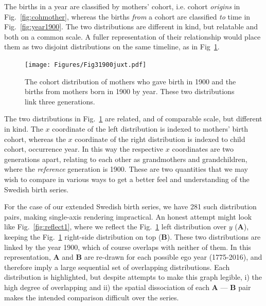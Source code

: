 \documentclass{article}
\begin{document}
The births in a year are classified by mothers' cohort, i.e. cohort \emph{origins} in Fig.~\ref{fig:cohmother}, whereas the births \emph{from} a cohort are classified \emph{to} time in Fig.~\ref{fig:year1900}. The two distributions are different in kind, but relatable and both on a common scale. A fuller representation of their relationship would place them as two disjoint distributions on the same timeline, as in Fig~\ref{fig:juxt}.

\begin{figure}[ht!]
 \centering
        \texttt{[image: Figures/Fig31900juxt.pdf]}
        \caption{The cohort distribution of mothers who gave birth in 1900 and the births from mothers born in 1900 by year. These two distributions link three generations.}
          \label{fig:juxt}
\end{figure}

The two distributions in Fig.~\ref{fig:juxt} are related, and of comparable scale, but different in kind. The $x$ coordinate of the left distribution is indexed to mothers' birth cohort, whereas the $x$ coordinate of the right distribution is indexed to child cohort, occurrence year. In this way the respective $x$ coordinates are two generations apart, relating to each other as grandmothers and grandchildren, where the \emph{reference} generation is 1900. These are two quantities that we may wish to compare in various ways to get a better feel and understanding of the Swedish birth series. 

For the case of our extended Swedish birth series, we have 281 such distribution pairs, making single-axis rendering impractical. An honest attempt might look like Fig.~\ref{fig:reflect1}, where we reflect the Fig.~\ref{fig:juxt} left distribution over $y$ (\textbf{A}), keeping the Fig.~\ref{fig:juxt} right-side distribution on top (\textbf{B}). These two distributions are linked by the year 1900, which of course overlaps with neither of them. In this representation, \textbf{A} and \textbf{B} are re-drawn for each possible ego year (1775-2016), and therefore imply a large sequential set of overlapping distributions. Each  distribution is highlighted, but despite attempts to make this graph legible, i) the high degree of overlapping and ii) the spatial dissociation of each \textbf{A} --- \textbf{B} pair makes the intended comparison difficult over the series.
\end{document}
